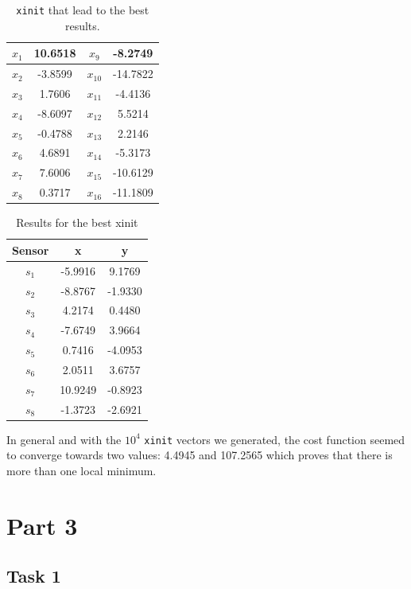 \begin{table}[H]
\caption{\texttt{xinit} that lead to the best results.}
\label{table:task9:xinit}
\centering
\begin{tabular}{| c | c | c | c |}
\hline
    $x_1$ & 10.6518 & $x_9$ & -8.2749 \\ \hline
    $x_2$ & -3.8599 & $x_{10}$ & -14.7822 \\ \hline
    $x_3$ & 1.7606 & $x_{11}$ & -4.4136 \\ \hline
    $x_4$ & -8.6097 & $x_{12}$ & 5.5214 \\ \hline
    $x_5$ & -0.4788 & $x_{13}$ & 2.2146 \\ \hline
    $x_6$ & 4.6891 & $x_{14}$ & -5.3173 \\ \hline
    $x_7$ & 7.6006 & $x_{15}$ & -10.6129 \\ \hline
    $x_8$ & 0.3717 & $x_{16}$ & -11.1809\\ \hline
\end{tabular}
\end{table}

\begin{table}[H]
\caption{Results for the best xinit}
\label{table:task9:results}
\centering
\begin{tabular}{| c | c | c |}
\hline
Sensor & x & y \\ \hline
$s_1$ & -5.9916 & 9.1769 \\ \hline
$s_2$ & -8.8767 & -1.9330 \\ \hline
$s_3$ & 4.2174 & 0.4480 \\ \hline
$s_4$ & -7.6749 & 3.9664 \\ \hline
$s_5$ & 0.7416 & -4.0953 \\ \hline
$s_6$ & 2.0511 & 3.6757 \\ \hline
$s_7$ & 10.9249 & -0.8923 \\ \hline
$s_8$ & -1.3723 & -2.6921 \\ \hline
\end{tabular}
\end{table}

In general and with the $10^4$ \texttt{xinit} vectors we generated, the cost function seemed to converge towards two values: 4.4945 and 107.2565 which proves that there is more than one local minimum.

\section{Part 3}

\subsection{Task 1}

